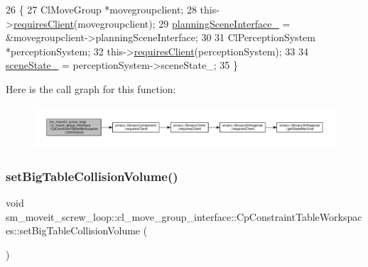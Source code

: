 \begin{DoxyCode}
26         \{
27             ClMoveGroup *movegroupclient;
28             this->\hyperlink{classsmacc_1_1ISmaccComponent_a36c085d906fbae0fcaee817aaeafebf4}{requiresClient}(movegroupclient);
29             \hyperlink{classsm__moveit__screw__loop_1_1cl__move__group__interface_1_1CpConstraintTableWorkspaces_aba416ccafc9506f7587ec32fefe6b5f4}{planningSceneInterface\_} = &movegroupclient->planningSceneInterface;
30 
31             ClPerceptionSystem *perceptionSystem;
32             this->\hyperlink{classsmacc_1_1ISmaccComponent_a36c085d906fbae0fcaee817aaeafebf4}{requiresClient}(perceptionSystem);
33 
34             \hyperlink{classsm__moveit__screw__loop_1_1cl__move__group__interface_1_1CpConstraintTableWorkspaces_ad16c51287b6178319fc8779eb88b28dd}{sceneState\_} = perceptionSystem->sceneState\_;
35         \}
\end{DoxyCode}
Here is the call graph for this function\+:
\nopagebreak
\begin{figure}[H]
\begin{center}
\leavevmode
\includegraphics[width=350pt]{classsm__moveit__screw__loop_1_1cl__move__group__interface_1_1CpConstraintTableWorkspaces_aaf31156acbb0c4acb0626807b92d8e3e_cgraph}
\end{center}
\end{figure}
\mbox{\label{classsm__moveit__screw__loop_1_1cl__move__group__interface_1_1CpConstraintTableWorkspaces_af5dbacf9dce9270788273a44ad4cbea4}} 
\subsubsection{\texorpdfstring{set\+Big\+Table\+Collision\+Volume()}{setBigTableCollisionVolume()}}
{\footnotesize\ttfamily void sm\+\_\+moveit\+\_\+screw\+\_\+loop\+::cl\+\_\+move\+\_\+group\+\_\+interface\+::\+Cp\+Constraint\+Table\+Workspaces\+::set\+Big\+Table\+Collision\+Volume (\begin{DoxyParamCaption}{ }\end{DoxyParamCaption})}



